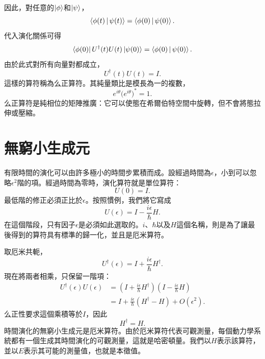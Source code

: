 因此，對任意的\(\left\lvert\phi\right\rangle\)和\(\left\lvert\psi\right\rangle\)，
\begin{equation}
\left\langle\phi(t)\,\middle|\,\psi(t)\right\rangle
=
\left\langle\phi(0)\,\middle|\,\psi(0)\right\rangle.
\end{equation}
代入演化關係可得
\begin{equation}
\left\langle\phi(0)\right\rvert U^\dagger(t)U(t)\left\lvert\psi(0)\right\rangle
=
\left\langle\phi(0)\,\middle|\,\psi(0)\right\rangle.
\end{equation}
由於此式對所有向量對都成立，
\begin{equation}
\boxed{U^\dagger(t)U(t)=I}.
\end{equation}
這樣的算符稱為么正算符。其純量類比是模長為一的複數，
\begin{equation}
e^{i\theta}\bigl(e^{i\theta}\bigr)^*=1.
\end{equation}
么正算符是純相位的矩陣推廣：它可以使態在希爾伯特空間中旋轉，但不會將態拉伸或壓縮。

\section{無窮小生成元}

有限時間的演化可以由許多極小的時間步累積而成。設經過時間為\(\epsilon\)，小到可以忽略\(\epsilon^2\)階的項。經過時間為零時，演化算符就是單位算符：
\begin{equation}
U(0)=I.
\end{equation}
最低階的修正必須正比於\(\epsilon\)。按照慣例，我們將它寫成
\begin{equation}
\boxed{U(\epsilon)=I-\frac{i\epsilon}{\hbar}H}.
\end{equation}
在這個階段，只有因子\(\epsilon\)是必須如此選取的。\(i\)、\(\hbar\)以及\(H\)這個名稱，則是為了讓最後得到的算符具有標準的歸一化，並且是厄米算符。

\begin{classroomqa}
\end{classroomqa}

取厄米共軛，
\begin{equation}
U^\dagger(\epsilon)
=I+\frac{i\epsilon}{\hbar}H^\dagger.
\end{equation}
現在將兩者相乘，只保留一階項：
\begin{align}
U^\dagger(\epsilon)U(\epsilon)
&=
\left(I+\frac{i\epsilon}{\hbar}H^\dagger\right)
\left(I-\frac{i\epsilon}{\hbar}H\right) \\
&=
I+\frac{i\epsilon}{\hbar}\left(H^\dagger-H\right)
+O(\epsilon^2).
\end{align}
么正性要求這個乘積等於\(I\)，因此
\begin{equation}
\boxed{H^\dagger=H}.
\end{equation}
時間演化的無窮小生成元是厄米算符。由於厄米算符代表可觀測量，每個動力學系統都有一個生成其時間演化的可觀測量，這就是哈密頓量。我們以\(H\)表示該算符，並以\(E\)表示其可能的測量值，也就是本徵值。

